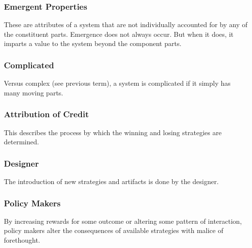\documentclass[jou,apacite]{apa6}
\begin{document}
\subsubsection{Emergent Properties}
These are attributes of a system that are not individually accounted for by any of the constituent parts.  Emergence does not always occur.  But when it does, it imparts a value to the system beyond the component parts.

\subsubsection{Complicated}
Versus complex (see previous term), a system is complicated if it simply has many moving parts.

\subsubsection{Attribution of Credit}
This describes the process by which the winning and losing strategies are determined.

\subsubsection{Designer}
The introduction of new strategies and artifacts is done by the designer.

\subsubsection{Policy Makers}
By increasing rewards for some outcome or altering some pattern of interaction, policy makers alter the consequences of available strategies with malice of forethought.
\end{document}
